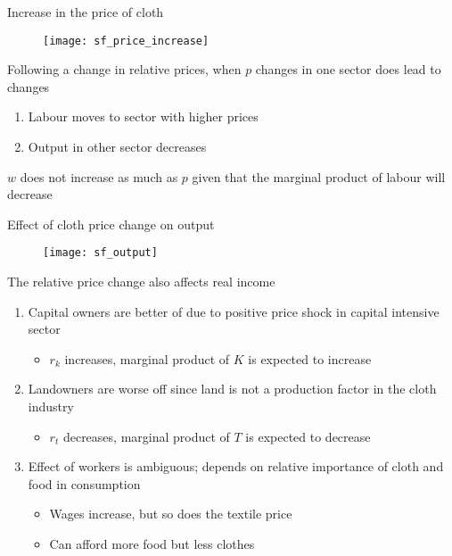 \documentclass{beamer}
\begin{document}
\begin{frame}{Increase in the price of cloth}
  \begin{figure}
    \texttt{[image: sf\_price\_increase]}
  \end{figure}
\end{frame}

\begin{frame}
  Following a change in relative prices, when $p$ changes in one sector does lead to changes
  \begin{enumerate}
    \item Labour moves to sector with higher prices
    \item Output in other sector decreases
  \end{enumerate}
  $w$ does not increase as much as $p$ given that the marginal product of labour will decrease
\end{frame}

\begin{frame}{Effect of cloth price change on output}
  \begin{figure}
    \texttt{[image: sf\_output]}
  \end{figure}
\end{frame}

\begin{frame}
  The relative price change also affects real income
  \begin{enumerate}
    \item Capital owners are better of due to positive price shock in capital intensive sector
    \begin{itemize}
      \item $r_k$ increases, marginal product of $K$ is expected to increase
    \end{itemize}
    \medskip
    \item Landowners are worse off since land is not a production factor in the cloth industry
    \begin{itemize}
      \item $r_t$ decreases, marginal product of $T$ is expected to decrease
    \end{itemize}
    \medskip
    \item Effect of workers is ambiguous; depends on relative importance of cloth and food in consumption
    \begin{itemize}
      \item Wages increase, but so does the textile price
      \item Can afford more food but less clothes
    \end{itemize}
  \end{enumerate}
\end{frame}
\end{document}
